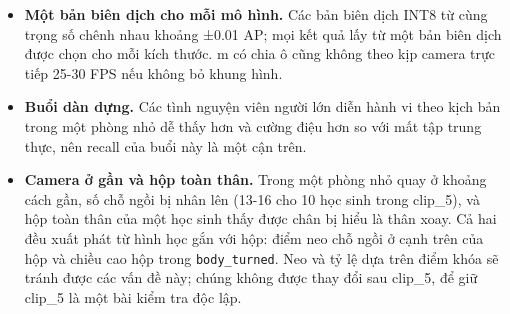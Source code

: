 \begin{itemize}
\item
  \textbf{Một bản biên dịch cho mỗi mô hình.} Các bản biên dịch INT8 từ cùng trọng số chênh nhau khoảng ±0.01 AP; mọi kết quả lấy từ một bản biên dịch được chọn cho mỗi kích thước. m có chia ô cũng không theo kịp camera trực tiếp 25-30 FPS nếu không bỏ khung hình.
\item
  \textbf{Buổi dàn dựng.} Các tình nguyện viên người lớn diễn hành vi theo kịch bản trong một phòng nhỏ dễ thấy hơn và cường điệu hơn so với mất tập trung thực, nên recall của buổi này là một cận trên.
\item
  \textbf{Camera ở gần và hộp toàn thân.} Trong một phòng nhỏ quay ở khoảng cách gần, số chỗ ngồi bị nhân lên (13-16 cho 10 học sinh trong clip\_5), và hộp toàn thân của một học sinh thấy được chân bị hiểu là thân xoay. Cả hai đều xuất phát từ hình học gắn với hộp: điểm neo chỗ ngồi ở cạnh trên của hộp và chiều cao hộp trong \texttt{body\_turned}. Neo và tỷ lệ dựa trên điểm khóa sẽ tránh được các vấn đề này; chúng không được thay đổi sau clip\_5, để giữ clip\_5 là một bài kiểm tra độc lập.
\end{itemize}

